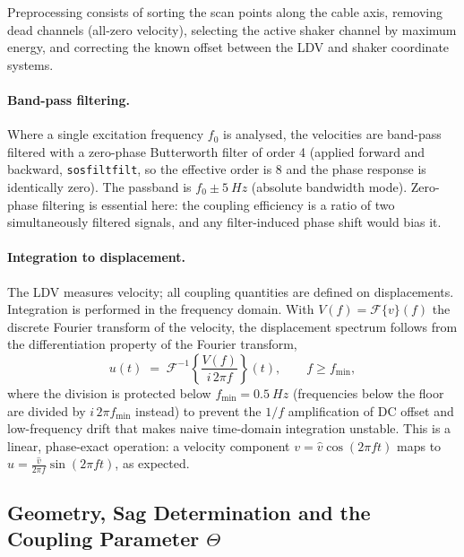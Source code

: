 Preprocessing consists of sorting the scan points along the cable axis,
removing dead channels (all-zero velocity), selecting the active shaker
channel by maximum energy, and correcting the known offset between the LDV
and shaker coordinate systems.

\paragraph{Band-pass filtering.}
Where a single excitation frequency $f_0$ is analysed, the velocities are
band-pass filtered with a zero-phase Butterworth filter of order 4
(applied forward and backward, \texttt{sosfiltfilt}, so the effective order
is 8 and the phase response is identically zero). The passband is
$f_0 \pm \SI{5}{Hz}$ (absolute bandwidth mode). Zero-phase filtering is
essential here: the coupling efficiency is a ratio of two simultaneously
filtered signals, and any filter-induced phase shift would bias it.

\paragraph{Integration to displacement.}
The LDV measures velocity; all coupling quantities are defined on
displacements. Integration is performed in the frequency domain. With
$V(f) = \mathcal{F}\{v\}(f)$ the discrete Fourier transform of the velocity,
the displacement spectrum follows from the differentiation property of the
Fourier transform,
\begin{equation}
  u(t) \;=\; \mathcal{F}^{-1}\!\left\{ \frac{V(f)}{i\,2\pi f} \right\}(t),
  \qquad f \ge f_\mathrm{min},
  \label{eq:integration}
\end{equation}
where the division is protected below $f_\mathrm{min} = \SI{0.5}{Hz}$
(frequencies below the floor are divided by $i\,2\pi f_\mathrm{min}$ instead)
to prevent the $1/f$ amplification of DC offset and low-frequency drift that
makes naive time-domain integration unstable. This is a linear, phase-exact
operation: a velocity component $v = \hat v\cos(2\pi f t)$ maps to
$u = \tfrac{\hat v}{2\pi f}\sin(2\pi f t)$, as expected.

\subsection{Geometry, Sag Determination and the Coupling Parameter $\Theta$}
\label{sec:proc:geometry}

